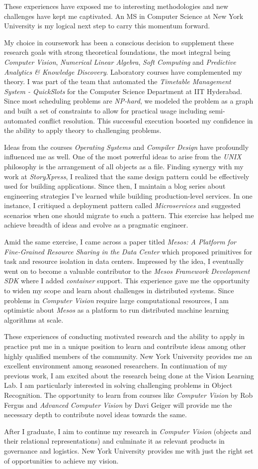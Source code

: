\documentclass{article}
\begin{document}
\justify
These experiences have exposed me to interesting methodologies and new challenges have kept me captivated. An MS in Computer
Science at New York University is my logical next step to carry this momentum forward.

\justify
My choice in coursework has been a conscious decision to supplement these research goals with strong theoretical foundations,
the most integral being {\it Computer Vision}, {\it Numerical Linear Algebra}, {\it Soft Computing} and
{\it Predictive Analytics \& Knowledge Discovery}. Laboratory courses have complemented my theory. I was part of the team
that automated the {\it Timetable Management System - QuickSlots} for the Computer Science Department at IIT Hyderabad.
Since most scheduling problems are {\it NP-hard}, we modeled the problem as a graph and built a set of constraints to allow
for practical usage including semi-automated conflict resolution. This successful execution boosted my confidence in the
ability to apply theory to challenging problems.

\justify
Ideas from the courses {\it Operating Systems} and {\it Compiler Design} have profoundly influenced me as well. One of
the most powerful ideas to arise from the {\it UNIX} philosophy is the arrangement of all objects as a file. Finding synergy
with my work at {\it StoryXpress}, I realized that the same design pattern could be effectively used for building applications.
Since then, I maintain a blog series about engineering strategies I’ve learned while building production-level services.
In one instance, I critiqued a deployment pattern called {\it Microservices} and suggested scenarios when one should migrate
to such a pattern. This exercise has helped me achieve breadth of ideas and evolve as a pragmatic engineer.

\justify
Amid the same exercise, I came across a paper titled {\it Mesos: A Platform for Fine-Grained Resource Sharing in the Data Center}
which proposed primitives for task and resource isolation in data centers. Impressed by the idea, I eventually went on to
become a valuable contributor to the {\it Mesos Framework Development SDK} where I added {\it container} support. This
experience gave me the opportunity to widen my scope and learn about challenges in distributed systems. Since problems in
{\it Computer Vision} require large computational resources, I am optimistic about {\it Mesos} as a platform to run distributed
machine learning algorithms at scale.

\justify
These experiences of conducting motivated research and the ability to apply in practice put me in a unique position to
learn and contribute ideas among other highly qualified members of the community. New York University provides me an
excellent environment among seasoned researchers. In continuation of my previous work, I am excited about the research
being done at the Vision Learning Lab. I am particularly interested in solving challenging problems in Object Recognition.
The opportunity to learn from courses like {\it Computer Vision} by Rob Fergus and {\it Advanced Computer Vision} by Davi
Geiger will provide me the necessary depth to contribute novel ideas towards the same.

\justify
After I graduate, I aim to continue my research in {\it Computer Vision} (objects and their relational representations)
and culminate it as relevant products in governance and logistics. New York University provides me with just the right
set of opportunities to achieve my vision.
\end{document}
